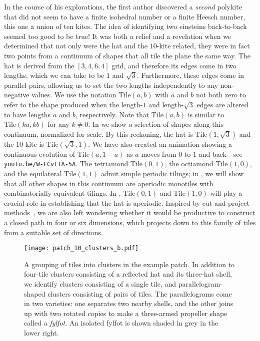 In the course of his explorations, the first author discovered a
\emph{second} polykite that did not seem to have a finite isohedral
number or a finite Heesch number, this one a union of ten kites.
The idea of identifying two einsteins back-to-back seemed too good to be 
true!  It was both a relief and a revelation when we determined that not
only were the hat and the $10$-kite related, they were in fact two
points from a continuum of shapes that all tile the plane the same
way.  The hat is derived from the $[3,4,6,4]$ grid, and therefore its edges
come in two lengths, which we can take to be $1$ and $\sqrt{3}$.  Furthermore,
these edges come in parallel pairs, allowing us to set the two lengths
independently to any non-negative values.  We use the notation 
$\mathrm{Tile}(a,b)$ with $a$ and $b$ not both zero to refer to the shape
produced when the length-$1$
and length-$\sqrt{3}$ edges are altered to have lengths $a$ and $b$,
respectively.  Note that $\mathrm{Tile}(a,b)$ is similar to
$\mathrm{Tile}(ka,kb)$ for any $k\neq 0$.  In  we show
a selection of shapes along this continuum, normalized for scale.
By this reckoning, the hat is $\mathrm{Tile}(1,\sqrt{3})$ and the 
$10$-kite is $\mathrm{Tile}(\sqrt{3},1)$.
We have also created an animation showing a continuous evolution
of $\mathrm{Tile}(a,1-a)$ as $a$ moves from $0$ to $1$ and back---see
\href{https://youtu.be/W-ECvtIA-5A}{\nolinkurl{youtu.be/W-ECvtIA-5A}}.
The tetriamond $\mathrm{Tile}(0,1)$, the octiamond $\mathrm{Tile}(1,0)$,
and the equilateral $\mathrm{Tile}(1,1)$ admit simple periodic tilings;
in , we will show that all other shapes in this continuum
are aperiodic monotiles with combinatorially equivalent tilings.
In , $\mathrm{Tile}(0,1)$ and $\mathrm{Tile}(1,0)$ 
will play a crucial role in establishing that the hat is aperiodic.
Inspired by cut-and-project methods~\cite{deBruijn1,deBruijn2}, we are also left
wondering
whether it would be productive to construct a closed path in four or
six dimensions, which projects down to this family of tiles from a suitable
set of directions.

\begin{figure}[htp!]
\begin{center}
\texttt{[image: patch\_10\_clusters\_b.pdf]}
\end{center}
\caption{\label{fig:patch10clu}A grouping of tiles into clusters in the
	example patch.  In addition to four-tile clusters consisting of a 
	reflected hat and its three-hat shell, we identify clusters consisting
	of a single tile, and parallelogram-shaped clusters consisting of
	pairs of tiles. The parallelograms come in two varieties: one 
	separates two nearby shells, and the other joins up with two rotated
	copies to make a three-armed propeller shape called a \textit{fylfot}.
	An isolated fylfot is shown shaded in grey in the lower right.}\end{figure}

